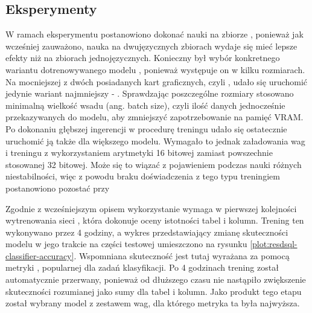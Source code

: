 \subsection{Eksperymenty}
W ramach eksperymentu postanowiono dokonać nauki  na zbiorze , ponieważ jak wcześniej zauważono, nauka na dwujęzycznych zbiorach wydaje się mieć lepsze efekty niż na zbiorach jednojęzycznych. Konieczny był wybór konkretnego wariantu dotrenowywanego modelu , ponieważ występuje on w kilku rozmiarach. Na mocniejszej z dwóch posiadanych kart graficznych, czyli , udało się uruchomić jedynie wariant najmniejszy - . Sprawdzając poszczególne rozmiary stosowano minimalną wielkość wsadu (ang. batch size), czyli ilość danych jednocześnie przekazywanych do modelu, aby zmniejszyć zapotrzebowanie na pamięć VRAM. Po dokonaniu głębszej ingerencji w procedurę treningu udało się ostatecznie uruchomić ją także dla większego modelu. Wymagało to jednak załadowania wag i treningu z wykorzystaniem arytmetyki 16 bitowej zamiast powszechnie stosowanej 32 bitowej. Może się to wiązać z pojawieniem podczas nauki różnych niestabilności, więc z powodu braku doświadczenia z tego typu treningiem postanowiono pozostać przy 

Zgodnie z wcześniejszym opisem wykorzystanie  wymaga w pierwszej kolejności wytrenowania sieci , która dokonuje oceny istotności tabel i kolumn. Trening ten wykonywano przez 4 godziny, a wykres przedstawiający zmianę skuteczności modelu w jego trakcie na części testowej umieszczono na rysunku \ref{plot:resdsql-classifier-accuracy}. Wspomniana skuteczność jest tutaj wyrażana za pomocą metryki  \cite{Ling2003}, popularnej dla zadań klasyfikacji. Po 4 godzinach trening został automatycznie przerwany, ponieważ od dłuższego czasu nie nastąpiło zwiększenie skuteczności rozumianej jako sumy  dla tabel i kolumn. Jako produkt tego etapu został wybrany model z zestawem wag, dla którego metryka ta była najwyższa.


